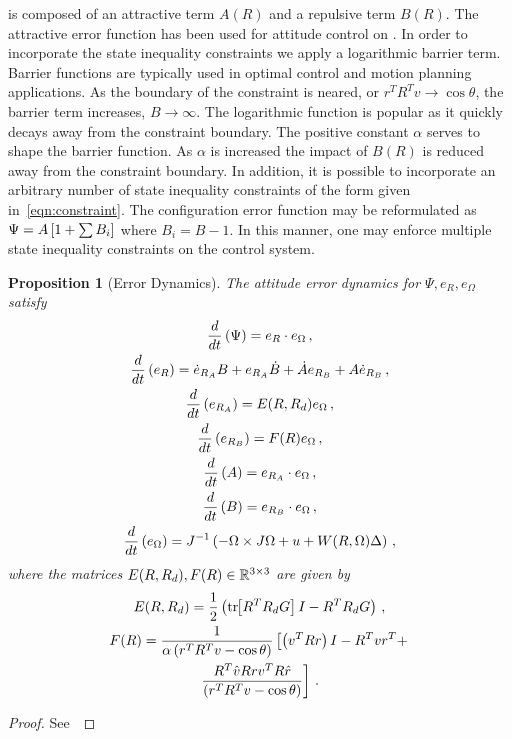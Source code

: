 \documentclass[letterpaper, 10 pt, conference]{ieeeconf}  %
\newtheorem{prop}{Proposition}
\begin{document}
 is composed of an attractive term \( A (R) \) and a repulsive term \( B(R) \).
The attractive error function has been used for attitude control on \SO.
In order to incorporate the state inequality constraints we apply a logarithmic barrier term.
Barrier functions are typically used in optimal control and motion planning applications.
As the boundary of the constraint is neared, or \( r^T R^T v \to \cos \theta \), the barrier term increases, \( B \to \infty\).
The logarithmic function is popular as it quickly decays away from the constraint boundary.
The positive constant \( \alpha \) serves to shape the barrier function.
As \( \alpha \) is increased the impact of \( B(R) \) is reduced away from the constraint boundary. 
In addition, it is possible to incorporate an arbitrary number of state inequality constraints of the form given in~\cref{eqn:constraint}.
The configuration error function may be reformulated as \( \Psi = A \left[ 1 + \sum B_i \right] \) where \( B_i = B - 1 \).
In this manner, one may enforce multiple state inequality constraints on the control system.
\begin{prop}[Error Dynamics]\label{prop:error_dyn}
	The attitude error dynamics for \( \Psi, e_R, e_\Omega \) satisfy 
	\begin{gather}
		\frac{d }{d t} \left( \Psi \right) = e_R \cdot e_\Omega \, , \label{eqn:psi_dot}\\
		\frac{d }{d t} \left( e_R \right) = \dot{e}_{R_A} B + e_{R_A} \dot{B} + \dot{A}e_{R_B} + A \dot{e}_{R_B} \, , \label{eqn:eR_dot}\\
		\frac{d }{d t} \left( e_{R_A} \right) = E(R, R_d) e_\Omega \, , \label{eqn:eRA_dot} \\
		\frac{d }{d t} \left( e_{R_B} \right) = F(R) e_\Omega \, , \label{eqn:eRB_dot} \\
		\frac{d }{d t} \left( A \right) = e_{R_A} \cdot e_\Omega \, , \label{eqn:A_dot} \\
		\frac{d }{d t} \left( B \right) = e_{R_B} \cdot e_\Omega \, , \label{eqn:B_dot} \\
		\frac{d }{d t} \left( e_\Omega \right) = J^{-1} \left( -\Omega \times J \Omega + u + W(R, \Omega) \Delta \right) \, , \label{eqn:eW_dot}
	\end{gather}
	where the matrices \(E(R,R_d), F(R) \in \mathbb{R}^{3\times3} \) are given by
	\begin{gather}
		E(R,R_d) = \frac{1}{2} \left( \mathrm{tr}\negthickspace\left[ R^T R_d G \right]I - R^T R_d G \right) \, , \label{eqn:E} \\
		F(R) = \frac{1}{\alpha \left( r^T R^T v - \cos \theta \right)} \left[\left( v^T R r \right) I - R^T v r^T + \right. \nonumber \\
		\left. \frac{R^T \hat{v} R r v^T R \hat{r}}{\left( r^T R^T v - \cos \theta \right)}\right] \, . \label{eqn:F}
	\end{gather}
\end{prop}
\begin{proof}
See~
\end{proof}
\end{document}
